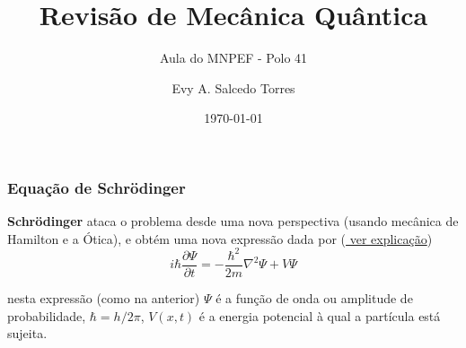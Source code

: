 \documentclass[12pt,brazil,table]{beamer}
\title{Revisão de Mecânica Quântica}
\subtitle{Aula do MNPEF - Polo 41}
\author{Evy A. Salcedo Torres}
\date{\today}
\begin{document}

\begin{frame}
  \titlepage
\end{frame}



\begin{frame}
  \frametitle{Equação de Schrödinger}
  
        \fontsize{11pt}{10pt}\selectfont
%       
%      
      
        \textbf{Schrödinger} ataca o problema desde uma nova perspectiva (usando mecânica de Hamilton e a Ótica), e obtém uma nova expressão dada por (\href{http://jde27.uk/blog/why-schrodinger.html}{\fontsize{7pt}{11pt}\selectfont \color{blue} ver explicação})
        \[
          i\hbar\dfrac{\partial \Psi}{\partial t} = -\dfrac{\hbar^2}{2m} \nabla^2 \Psi + V \Psi
        \]
        
        nesta expressão (como na anterior) $\Psi$ é a função de onda ou amplitude de probabilidade, $\hbar = h/2\pi$, $V(x,t)$ é a energia potencial à qual a partícula está sujeita.

  
\end{frame}
   
\end{document}
